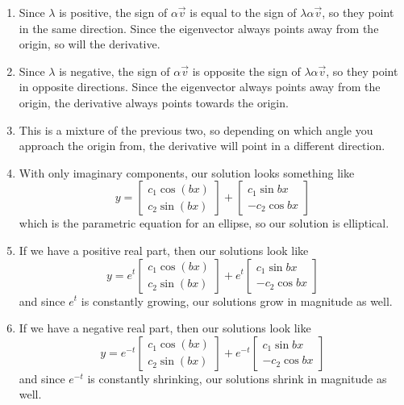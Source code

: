 \documentclass{article}
\begin{document}
\begin{customproof}
\begin{enumerate}
    \item Since $\lambda$ is positive, the sign of $\alpha\vec{v}$ is equal to the sign of $\lambda\alpha\vec{v}$, so they point in the same direction. Since the eigenvector always points away from the origin, so will the derivative.
    \item Since $\lambda$ is negative, the sign of $\alpha\vec{v}$ is opposite the sign of $\lambda\alpha\vec{v}$, so they point in opposite directions. Since the eigenvector always points away from the origin, the derivative always points towards the origin.
    \item This is a mixture of the previous two, so depending on which angle you approach the origin from, the derivative will point in a different direction.
    \item With only imaginary components, our solution looks something like $$y=\begin{bmatrix}
        c_1\cos(bx) \\ c_2\sin(bx)
    \end{bmatrix} + \begin{bmatrix}
        c_1\sin{bx} \\ -c_2\cos{bx}
    \end{bmatrix}$$which is the parametric equation for an ellipse, so our solution is elliptical.
    \item If we have a positive real part, then our solutions look like $$y=e^t\begin{bmatrix}
        c_1\cos(bx) \\ c_2\sin(bx)
    \end{bmatrix} + e^t\begin{bmatrix}
        c_1\sin{bx} \\ -c_2\cos{bx}
    \end{bmatrix}$$and since $e^t$ is constantly growing, our solutions grow in magnitude as well.
    \item If we have a negative real part, then our solutions look like $$y=e^{-t}\begin{bmatrix}
        c_1\cos(bx) \\ c_2\sin(bx)
    \end{bmatrix} + e^{-t}\begin{bmatrix}
        c_1\sin{bx} \\ -c_2\cos{bx}
    \end{bmatrix}$$and since $e^{-t}$ is constantly shrinking, our solutions shrink in magnitude as well.
\end{enumerate}
\end{customproof}
\end{document}
